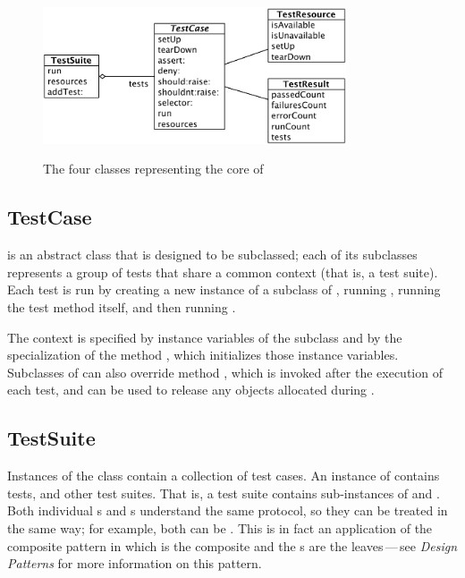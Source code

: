 \documentclass[a4paper,10pt,twoside]{book}
\begin{document}
\begin{figure}[htb]
  \begin{center}
		{\includegraphics[width=0.8\textwidth]{sunit-classes}}
	\caption{The four classes representing the core of \SUnit}
  \end{center}
\end{figure}


\subsection{TestCase}

 is an abstract class that is designed to be subclassed; each of its subclasses represents a group of tests that share a common context (that is, a test suite).
Each test is run by creating a new instance of a subclass of ,
running , running the test method itself, and then running .

The context is specified
by instance variables of the subclass
and by the specialization of the method
, which initializes those instance variables.
Subclasses of  can also override method
, which is invoked after the execution of each test,
and can be used to release any objects
allocated during .
\subsection{TestSuite}

Instances of the class  contain a collection of test cases.  An
instance of  contains tests, and other test suites.
That is, a test suite contains sub-instances of
 and .
Both individual s and s understand the same protocol, so they can be treated in the same way; for example, both can be .
This is in fact an application of the composite
pattern in which  is the composite and the
s are the leaves\,---\,see \textit{Design Patterns} for more information on this pattern\cite{Gamm95a}.
\end{document}
